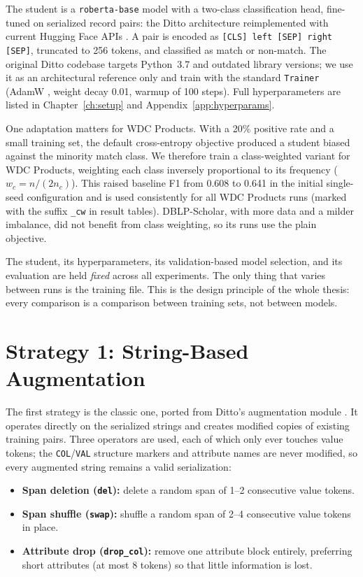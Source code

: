 \documentclass[a4paper,oneside,bibliography=totoc]{scrbook}
\begin{document}
The student is a \texttt{roberta-base} model \cite{liu2019roberta} with a two-class classification head, fine-tuned on serialized record pairs: the Ditto architecture \cite{li2020deep} reimplemented with current Hugging Face APIs \cite{wolf2020transformers}. A pair is encoded as \texttt{[CLS] left [SEP] right [SEP]}, truncated to 256 tokens, and classified as match or non-match. The original Ditto codebase targets Python~3.7 and outdated library versions; we use it as an architectural reference only and train with the standard \texttt{Trainer} (AdamW \cite{loshchilov2019decoupled}, weight decay 0.01, warmup of 100 steps). Full hyperparameters are listed in Chapter~\ref{ch:setup} and Appendix~\ref{app:hyperparams}.

One adaptation matters for WDC Products. With a 20\% positive rate and a small training set, the default cross-entropy objective produced a student biased against the minority match class. We therefore train a class-weighted variant for WDC Products, weighting each class inversely proportional to its frequency ($w_c = n/(2 n_c)$). This raised baseline F1 from 0.608 to 0.641 in the initial single-seed configuration and is used consistently for all WDC Products runs (marked with the suffix \texttt{\_cw} in result tables). DBLP-Scholar, with more data and a milder imbalance, did not benefit from class weighting, so its runs use the plain objective.

The student, its hyperparameters, its validation-based model selection, and its evaluation are held \emph{fixed} across all experiments. The only thing that varies between runs is the training file. This is the design principle of the whole thesis: every comparison is a comparison between training sets, not between models.

\section{Strategy 1: String-Based Augmentation}
\label{sec:method_string}

The first strategy is the classic one, ported from Ditto's augmentation module \cite{li2020deep}. It operates directly on the serialized strings and creates modified copies of existing training pairs. Three operators are used, each of which only ever touches value tokens; the \texttt{COL}/\texttt{VAL} structure markers and attribute names are never modified, so every augmented string remains a valid serialization:

\begin{itemize}
\item \textbf{Span deletion (\texttt{del}):} delete a random span of 1--2 consecutive value tokens.
\item \textbf{Span shuffle (\texttt{swap}):} shuffle a random span of 2--4 consecutive value tokens in place.
\item \textbf{Attribute drop (\texttt{drop\_col}):} remove one attribute block entirely, preferring short attributes (at most 8 tokens) so that little information is lost.
\end{itemize}
\end{document}
